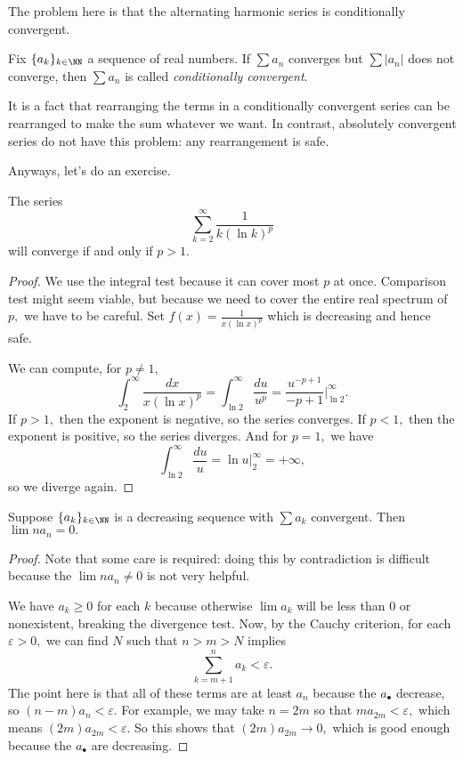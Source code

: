 \documentclass[../notes.tex]{subfiles}
\begin{document}
The problem here is that the alternating harmonic series is conditionally convergent.
\begin{definition}
	Fix $\{a_k\}_{k\in\NN}$ a sequence of real numbers. If $\sum a_n$ converges but $\sum|a_n|$ does not converge, then $\sum a_n$ is called \textit{conditionally convergent}.
\end{definition}
It is a fact that rearranging the terms in a conditionally convergent series can be rearranged to make the sum whatever we want. In contrast, absolutely convergent series do not have this problem: any rearrangement is safe.

Anyways, let's do an exercise.
\begin{exercise}
	The series
	\[\sum_{k=2}^\infty\frac1{k(\ln k)^p}\]
	will converge if and only if $p>1.$
\end{exercise}
\begin{proof}
	We use the integral test because it can cover most $p$ at once. Comparison test might seem viable, but because we need to cover the entire real spectrum of $p,$ we have to be careful. Set $f(x)=\frac1{x(\ln x)^p}$ which is decreasing and hence safe.
	
	We can compute, for $p\ne1,$
	\[\int_2^\infty\frac{dx}{x(\ln x)^p}=\int_{\ln2}^\infty\frac{du}{u^p}=\frac{u^{-p+1}}{-p+1}\bigg|_{\ln2}^\infty.\]
	If $p>1,$ then the exponent is negative, so the series converges. If $p<1,$ then the exponent is positive, so the series diverges. And for $p=1,$ we have
	\[\int_{\ln2}^\infty\frac{du}u=\ln u\bigg|_2^\infty=+\infty,\]
	so we diverge again.
\end{proof}
\begin{exercise}
	Suppose $\{a_k\}_{k\in\NN}$ is a decreasing sequence with $\sum a_k$ convergent. Then $\lim na_n=0.$
\end{exercise}
\begin{proof}
	Note that some care is required: doing this by contradiction is difficult because the $\lim na_n\ne0$ is not very helpful.

	We have $a_k\ge0$ for each $k$ because otherwise $\lim a_k$ will be less than $0$ or nonexistent, breaking the divergence test. Now, by the Cauchy criterion, for each $\varepsilon>0,$ we can find $N$ such that $n>m>N$ implies
	\[\sum_{k=m+1}^na_k<\varepsilon.\]
	The point here is that all of these terms are at least $a_n$ because the $a_\bullet$ decrease, so $(n-m)a_n<\varepsilon.$ For example, we may take $n=2m$ so that $ma_{2m}<\varepsilon,$ which means $(2m)a_{2m}<\varepsilon.$ So this shows that $(2m)a_{2m}\to0,$ which is good enough because the $a_\bullet$ are decreasing.
\end{proof}
\end{document}
